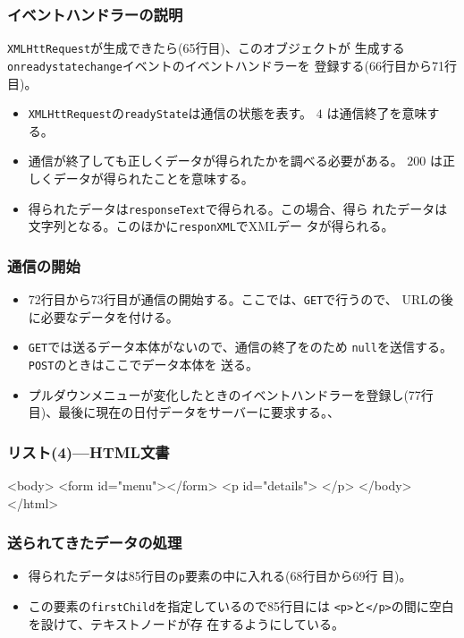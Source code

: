 \begin{frame}[containsverbatim]
\frametitle{イベントハンドラーの説明}
\texttt{XMLHttRequest}が生成できたら(65行目)、このオブジェクトが
       生成する\texttt{onreadystatechange}イベントのイベントハンドラーを
       登録する(66行目から71行目)。
 \begin{itemize}
  \item \texttt{XMLHttRequest}の\texttt{readyState}は通信の状態を表す。
	$4$ は通信終了を意味する。
  \item 通信が終了しても正しくデータが得られたかを調べる必要がある。
	$200$ は正しくデータが得られたことを意味する。
  \item 得られたデータは\texttt{responseText}で得られる。この場合、得ら
	れたデータは文字列となる。このほかに\texttt{responXML}でXMLデー
	タが得られる。
 \end{itemize}
\frametitle{通信の開始}
\begin{itemize}
 \item 72行目から73行目が通信の開始する。ここでは、\texttt{GET}で行うので、
       URLの後に必要なデータを付ける。
 \item \texttt{GET}では送るデータ本体がないので、通信の終了をのため
       \texttt{null}を送信する。\texttt{POST}のときはここでデータ本体を
       送る。
 \item プルダウンメニューが変化したときのイベントハンドラーを登録し(77行
       目)、最後に現在の日付データをサーバーに要求する。、
\end{itemize}
\end{frame}
\begin{frame}[containsverbatim]
\frametitle{リスト(4)---HTML文書}
\begin{listingcont}
<body>
  <form id="menu"></form>
  <p id="details"> </p>
</body>
</html>
\end{listingcont}
\end{frame}
\begin{frame}[containsverbatim]
\frametitle{送られてきたデータの処理}
\begin{itemize}
 \item 得られたデータは85行目の\texttt{p}要素の中に入れる(68行目から69行
       目)。
 \item この要素の\texttt{firstChild}を指定しているので85行目には
       \texttt{<p>}と\texttt{</p>}の間に空白を設けて、テキストノードが存
       在するようにしている。
\end{itemize}\end{frame}
